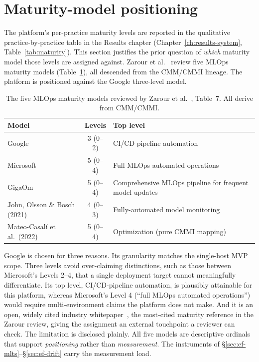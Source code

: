 \section{Maturity-model positioning}
\label{sec:ef-maturity}

The platform's per-practice maturity levels are reported in the qualitative
practice-by-practice table in the Results chapter
(Chapter~\ref{ch:results-system}, Table~\ref{tab:maturity}). This section
justifies the prior question of \emph{which} maturity model those levels are
assigned against. Zarour et al.~\cite{zarour2025} review five MLOps maturity
models (Table~\ref{tab:ef-maturity-candidates}), all descended from the
CMM/CMMI lineage. The platform is positioned against the Google three-level
model.

\begin{table}[h]
  \centering
  \caption{The five MLOps maturity models reviewed by Zarour et al.~\cite{zarour2025}, Table~7. All derive from CMM/CMMI.}
  \label{tab:ef-maturity-candidates}
  \begin{tabularx}{\linewidth}{@{}l c X@{}}
    \toprule
    \textbf{Model} & \textbf{Levels} & \textbf{Top level} \\
    \midrule
    Google                                  & 3 (0--2) & CI/CD pipeline automation \\
    Microsoft                               & 5 (0--4) & Full MLOps automated operations \\
    GigaOm                                  & 5 (0--4) & Comprehensive MLOps pipeline for frequent model updates \\
    John, Olsson \& Bosch (2021)            & 4 (0--3) & Fully-automated model monitoring \\
    Mateo-Casal\'i et al.\ (2022)            & 5 (0--4) & Optimization (pure CMMI mapping) \\
    \bottomrule
  \end{tabularx}
\end{table}

Google is chosen for three reasons. Its granularity matches the single-host MVP
scope. Three levels avoid over-claiming distinctions, such as those between
Microsoft's Levels 2--4, that a single deployment target cannot meaningfully
differentiate. Its top level, CI/CD-pipeline automation, is plausibly attainable
for this platform, whereas Microsoft's Level 4 (``full MLOps automated
operations'') would require multi-environment claims the platform does not make.
And it is an open, widely cited industry whitepaper~\cite{google_mlops_maturity},
the most-cited maturity reference in the Zarour review, giving the assignment an
external touchpoint a reviewer can check. The limitation is disclosed plainly.
All five models are descriptive ordinals that support \emph{positioning} rather
than \emph{measurement}. The instruments of \S\ref{sec:ef-mlts}--\S\ref{sec:ef-drift}
carry the measurement load.

